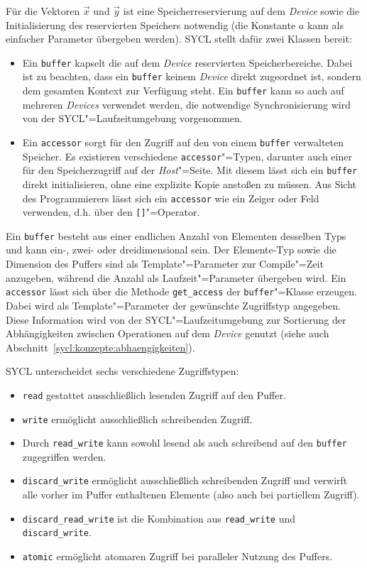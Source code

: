Für die Vektoren $\vec{x}$ und $\vec{y}$ ist eine Speicherreservierung auf dem
\textit{Device} sowie die Initialisierung des reservierten Speichers notwendig
(die Konstante $a$ kann als einfacher Parameter übergeben werden). SYCL stellt
dafür zwei Klassen bereit:
%
\begin{itemize}
    \item Ein \texttt{buffer} kapselt die auf dem \textit{Device} reservierten
          Speicherbereiche. Dabei ist zu beachten, dass ein \texttt{buffer}
          keinem \textit{Device} direkt zugeordnet ist, sondern dem gesamten
          Kontext zur Verfügung steht. Ein \texttt{buffer} kann so auch auf
          mehreren \textit{Devices} verwendet werden, die notwendige
          Synchronisierung wird von der SYCL"=Laufzeitumgebung vorgenommen.
    \item Ein \texttt{accessor} sorgt für den Zugriff auf den von einem
          \texttt{buffer} verwalteten Speicher. Es existieren verschiedene
          \texttt{accessor}"=Typen, darunter auch einer für den Speicherzugriff
          auf der \textit{Host}"=Seite. Mit diesem lässt sich ein
          \texttt{buffer} direkt initialisieren, ohne eine explizite Kopie
          anstoßen zu müssen. Aus Sicht des Programmierers lässt sich ein
          \texttt{accessor} wie ein Zeiger oder Feld verwenden, d.h. über den
          \texttt{[]}"=Operator.
\end{itemize}
%
\noindent
Ein \texttt{buffer} besteht aus einer endlichen Anzahl von Elementen desselben
Typs und kann ein-, zwei- oder dreidimensional sein. Der Elemente-Typ sowie die
Dimension des Puffers sind als Template"=Parameter zur Compile"=Zeit anzugeben,
während die Anzahl als Laufzeit"=Parameter übergeben wird. Ein \texttt{accessor}
lässt sich über die Methode \texttt{get\_access} der \texttt{buffer}"=Klasse
erzeugen. Dabei wird als Template"=Parameter der gewünschte Zugriffstyp
angegeben. Diese Information wird von der SYCL"=Laufzeitumgebung zur Sortierung
der Abhängigkeiten zwischen Operationen auf dem \textit{Device} genutzt (siehe
auch Abschnitt~\ref{sycl:konzepte:abhaengigkeiten}).

SYCL unterscheidet sechs verschiedene Zugriffstypen:
\begin{itemize}
    \item \texttt{read} gestattet ausschließlich lesenden Zugriff auf den
          Puffer.
    \item \texttt{write} ermöglicht ausschließlich schreibenden Zugriff.
    \item Durch \texttt{read\_write} kann sowohl lesend als auch schreibend
          auf den \texttt{buffer} zugegriffen werden.
    \item \texttt{discard\_write} ermöglicht ausschließlich schreibenden Zugriff
          und verwirft alle vorher im Puffer enthaltenen Elemente (also auch bei
          partiellem Zugriff).
    \item \texttt{discard\_read\_write} ist die Kombination aus
          \texttt{read\_write} und \texttt{discard\_write}.
    \item \texttt{atomic} ermöglicht atomaren Zugriff bei paralleler Nutzung des
          Puffers.
\end{itemize}

